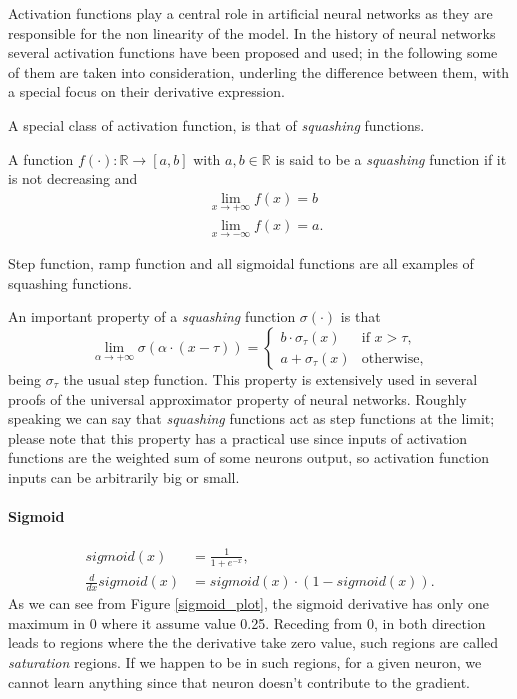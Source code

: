 Activation functions play a central role in artificial neural networks as they are responsible for the non linearity of the model.
In the history of neural networks several activation functions have been proposed and used; in the following some of them are taken into consideration,
underling the difference between them, with a special focus on their derivative expression.

A special class of activation function, is that of \textit{squashing} functions.

\begin{defn}
A function $f(\cdot):\mathbb{R}\rightarrow[a,b]$ with $a,b \in \mathbb{R}$ is said to be a \textit{squashing} function if it is not decreasing and 
\begin{align}
&\lim_{x \to +\infty} f(x) = b \\
&\lim_{x \to -\infty} f(x) = a.
\end{align}
\end{defn}
Step function, ramp function and all sigmoidal functions are all examples of squashing functions.

\begin{remark}
An important property of a \textit{squashing} function $\sigma(\cdot)$ is that
\begin{equation}
 \lim_{\alpha \to +\infty} \sigma(\alpha\cdot (x-\tau))= 
 \begin{cases}
    b \cdot \sigma_{\tau}(x) & \text{if $x> \tau $},\\
    a + \sigma_{\tau}(x) & \text{otherwise},
  \end{cases}
\end{equation}
being $\sigma_{\tau}$ the usual step function.
This property is extensively used in several proofs of the universal approximator property of neural networks. Roughly speaking we can say that \textit{squashing} functions act as step functions
at the limit; please note that this property has a practical use since inputs of activation functions are the weighted sum of some neurons output,
so activation function inputs can be arbitrarily big or small.
\end{remark}


\paragraph{Sigmoid}

\begin{align}
sigmoid(x)&= \frac{1}{1+e^{-x}},  \\ 
\frac{d}{dx}sigmoid(x)&= sigmoid(x) \cdot (1-sigmoid(x)).
\end{align}
As we can see from Figure \ref{sigmoid_plot}, the sigmoid derivative has only one maximum in 0 where it assume value 0.25. Receding from 0, in both direction leads to regions where
the the derivative take zero value, such regions are called \textit{saturation} regions. If we happen to be in such regions, for a given neuron, we cannot learn anything since that neuron doesn't contribute
to the gradient.

